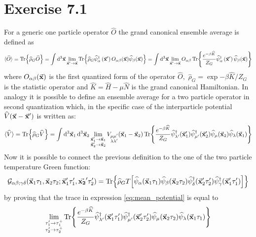 \documentclass[a4paper]{article}
\newcommand{\meanv}[1]{\langle #1 \rangle}
\renewcommand{\hat}{\widehat}
\begin{document}
\section*{Exercise 7.1}
For a generic one particle operator $\hat{O}$ the grand canonical ensemble average is defined as
\begin{equation}
\meanv{\hat{O}} = \Tr{\hat{\rho}_G \hat{O}} = \int \dd[3]{\va{x}} \lim_{\va{x}'\rightarrow\va{x}}\Tr{\widehat{\rho}_{G} \hat{\psi}_{\alpha}^{\dagger}\left(\va{x}^{\prime}\right) O_{\alpha \beta}(\va{x}) \hat{\psi}_{\beta}(\va{x})}
= \int \dd[3]{\va{x}} \lim_{\va{x}'\rightarrow\va{x}} O_{\alpha\beta}\Tr{\frac{e^{-\beta\hat{K}}}{Z_G}\hat{\psi}_{\alpha}^{\dagger}\left(\va{x}^{\prime}\right)  \hat{\psi}_{\beta}(\va{x}) }
\end{equation}
where $O_{\alpha\beta}(\va{x})$ is the first quantized form of the operator $\hat{O},$ $\hat{\rho}_G = \exp{-\beta\hat{K}}/Z_G$ is the statistic operator and $\hat{K} = \hat{H} - \mu\hat{N}$ is the grand canonical Hamiltonian.
In analogy it is possible to define an ensemble average for a two particle operator in second quantization which, in the specific case of the interparticle potential $\hat{V}(\va{x} - \va{x}')$ is written as:
\begin{equation}
\meanv{\hat{V}} = \Tr{\hat{\rho}_G\hat{V}} = \int\dd[3]{\va{x}_1}\dd[3]{\va{x}_2} \lim_{\substack{\va{x}_1'\rightarrow\va{x}_1\\\va{x}_2'\rightarrow\va{x}_2}} 
V_{\substack{\mu\mu'\\\lambda\lambda'}}(\va{x}_1 - \va{x}_2)
\Tr{\frac{e^{-\beta\hat{K}}}{Z_G}
\hat{\psi}^\dag_{\lambda'}(\va{x}_1')\hat{\psi}^\dag_{\mu'}(\va{x}_2')\hat{\psi}_\mu(\va{x}_2)\hat{\psi}_\lambda(\va{x}_1)}
\label{eq:mean_potential}
\end{equation}
Now it is possible to connect the previous definition to the one of the two particle temperature Green function:
\begin{equation}
\mathcal{G}_{\alpha\beta;\gamma\delta}(\va{x}_1\tau_1,\va{x}_2\tau_2;\va{x}_1'\tau_1',\va{x_2}'\tau_2')
= \Tr{\hat{\rho}_G T\bqty{\hat{\psi}_\alpha(\va{x}_1\tau_1) \hat{\psi}_\beta(\va{x}_2\tau_2)\hat{\psi}_\delta^\dag(\va{x}_2'\tau_2') \hat{\psi}_\gamma^\dag(\va{x}_1'\tau_1')}}
\label{eq:temp_GF}
\end{equation}
by proving that the trace in expression \eqref{eq:mean_potential} is equal to 
\begin{equation}
\lim_{\substack{\tau_1'\rightarrow\tau_1^+\\\tau_2'\rightarrow\tau_2^+}}
\Tr{\frac{e^{-\beta\hat{K}}}{Z_G}
\hat{\psi}_{\lambda'}^\dag(\va{x}_1'\tau_1') \hat{\psi}_{\mu'}^\dag(\va{x}_2'\tau_2')
\hat{\psi}_\mu(\va{x}_2\tau_2) \hat{\psi}_\lambda(\va{x}_1\tau_1)}
\label{eq:time_dep_trace}
\end{equation}
\end{document}

